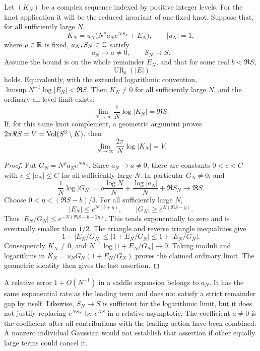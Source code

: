 \begin{theorem}
\label{prop:volume-rate-transfer}
Let $(K_N)$ be a complex sequence indexed by positive integer levels.
For the knot application it will be the reduced invariant of one fixed
knot.
Suppose that, for all sufficiently large $N$,
\begin{equation}\label{eq:complex-packet-decomposition}
 K_N=u_N\bigl(N^\rho a_N e^{NS_N}+E_N\bigr),
 \qquad |u_N|=1,
\end{equation}
where $\rho\in\mathbb R$ is fixed, $a_N,S_N\in\mathbb C$ satisfy
\[
                a_N\longrightarrow a\ne0,
                \qquad S_N\longrightarrow S.
\]
Assume the bound is on the whole remainder $E_N$, and that for some
real $b<\Re S$,
\begin{equation}\label{eq:entire-remainder-gap}
                  \operatorname{UR}_b(|E|)
\end{equation}
holds. Equivalently, with the extended logarithmic convention,
$\limsup N^{-1}\log|E_N|<\Re S$.
Then $K_N\ne0$ for all sufficiently large $N$, and the ordinary
all-level limit exists:
\[
               \lim_{N\to\infty}\frac1N\log|K_N|=\Re S.
\]
If, for this same knot complement, a geometric argument proves
$2\pi\Re S=V=\operatorname{Vol}(S^3\setminus K)$, then
\[
                \lim_{N\to\infty}\frac{2\pi}{N}\log|K_N|=V.
\]
\end{theorem}

\begin{proof}
Put $G_N=N^\rho a_Ne^{NS_N}$. Since $a_N\to a\ne0$,
there are constants $0<c<C$ with $c\le|a_N|\le C$ for all
sufficiently large $N$. In particular $G_N\ne0$, and
\[
 \frac1N\log|G_N|
 =\rho\frac{\log N}{N}+\frac{\log|a_N|}{N}+\Re S_N
 \longrightarrow\Re S.
\]
Choose $0<\eta<(\Re S-b)/3$. For all sufficiently large $N$,
\[
       |E_N|\le e^{N(b+\eta)},\qquad
       |G_N|\ge e^{N(\Re S-\eta)}.
\]
Thus $|E_N/G_N|\le e^{-N(\Re S-b-2\eta)}$.
This tends exponentially to zero and is eventually smaller than
$1/2$. The triangle and reverse triangle inequalities give
\[
 1-|E_N/G_N|\le|1+E_N/G_N|\le1+|E_N/G_N|.
\]
Consequently $K_N\ne0$, and
$N^{-1}\log|1+E_N/G_N|\to0$. Taking moduli and logarithms in
$K_N=u_NG_N(1+E_N/G_N)$ proves the claimed ordinary limit.
The geometric identity then gives the last assertion.
\end{proof}

A relative error $1+O(N^{-1})$ in a saddle expansion belongs to
$a_N$. It has the same exponential rate as the leading term and
does not satisfy a strict remainder gap by itself. Likewise,
$S_N\to S$ is sufficient for the logarithmic limit, but it does not
justify replacing $e^{NS_N}$ by $e^{NS}$ in a relative asymptotic.
The coefficient $a\ne0$ is the coefficient after all contributions
with the leading action have been combined. A nonzero individual
Gaussian would not establish that assertion if other equally large
terms could cancel it.

